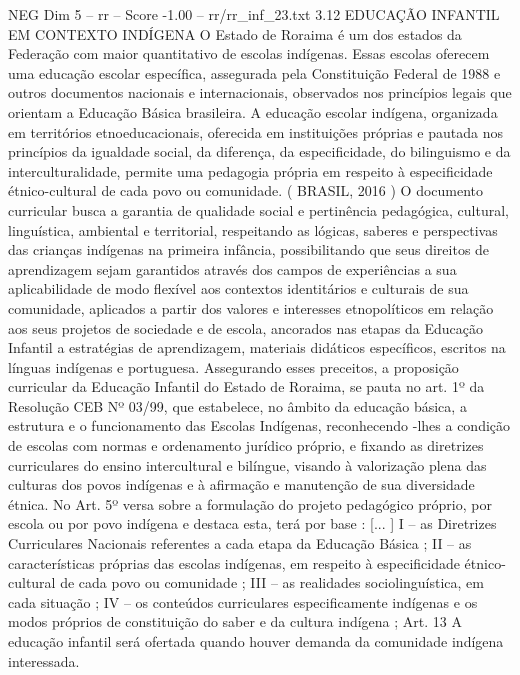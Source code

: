 \begin{textsample}{NEG Dim 5 – rr – Score -1.00 – rr/rr\_inf\_23.txt}  \label{ex:f5_neg_064}
3.12 EDUCAÇÃO INFANTIL EM CONTEXTO INDÍGENA O Estado de Roraima é um dos estados da Federação com maior quantitativo de escolas indígenas.
Essas escolas oferecem uma educação escolar específica, assegurada pela Constituição Federal de 1988 e outros documentos nacionais e internacionais, observados nos princípios legais que orientam a Educação Básica brasileira.
A educação escolar indígena, organizada em territórios etnoeducacionais, oferecida em instituições próprias e pautada nos princípios da igualdade social, da diferença, da especificidade, do bilinguismo e da interculturalidade, permite uma pedagogia própria em respeito à especificidade étnico-cultural de cada povo ou comunidade. ( BRASIL, 2016 ) O documento curricular busca a garantia de qualidade social e pertinência pedagógica, cultural, linguística, ambiental e territorial, respeitando as lógicas, saberes e perspectivas das crianças indígenas na primeira infância, possibilitando que seus direitos de aprendizagem sejam garantidos através dos campos de experiências a sua aplicabilidade de modo flexível aos contextos identitários e culturais de sua comunidade, aplicados a partir dos valores e interesses etnopolíticos em relação aos seus projetos de sociedade e de escola, ancorados nas etapas da Educação Infantil a estratégias de aprendizagem, materiais didáticos específicos, escritos na línguas indígenas e portuguesa.
Assegurando esses preceitos, a proposição curricular da Educação Infantil do Estado de Roraima, se pauta no art. 1º da Resolução CEB Nº 03/99, que estabelece, no âmbito da educação básica, a estrutura e o funcionamento das Escolas Indígenas, reconhecendo -lhes a condição de escolas com normas e ordenamento jurídico próprio, e fixando as diretrizes curriculares do ensino intercultural e bilíngue, visando à valorização plena das culturas dos povos indígenas e à afirmação e manutenção de sua diversidade étnica.
No Art. 5º versa sobre a formulação do projeto pedagógico próprio, por escola ou por povo indígena e destaca esta, terá por base : [... ] I – as Diretrizes Curriculares Nacionais referentes a cada etapa da Educação Básica ; II – as características próprias das escolas indígenas, em respeito à especificidade étnico-cultural de cada povo ou comunidade ; III – as realidades sociolinguística, em cada situação ; IV – os conteúdos curriculares especificamente indígenas e os modos próprios de constituição do saber e da cultura indígena ; Art. 13 A educação infantil será ofertada quando houver demanda da comunidade indígena interessada.

\end{textsample}
